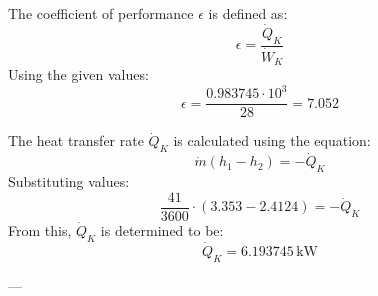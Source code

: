 The coefficient of performance \( \epsilon \) is defined as:  
\[
\epsilon = \frac{\dot{Q}_K}{\dot{W}_K}
\]  
Using the given values:  
\[
\epsilon = \frac{0.983745 \cdot 10^3}{28} = 7.052
\]  

The heat transfer rate \( \dot{Q}_K \) is calculated using the equation:  
\[
\dot{m} (h_1 - h_2) = -\dot{Q}_K
\]  
Substituting values:  
\[
\frac{41}{3600} \cdot (3.353 - 2.4124) = -\dot{Q}_K
\]  
From this, \( \dot{Q}_K \) is determined to be:  
\[
\dot{Q}_K = 6.193745 \, \text{kW}
\]  

---